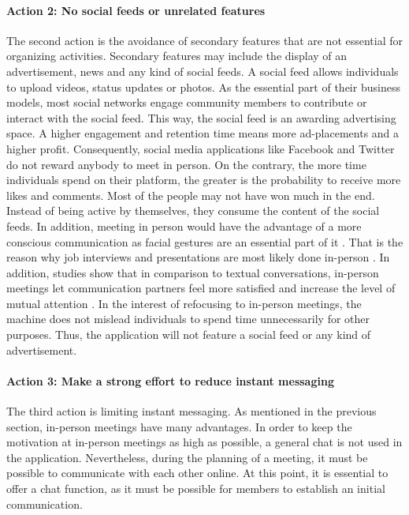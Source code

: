 \documentclass[12pt,numbers=noenddot,parskip,bibliography=totocnumbered,listof=totocnumbered]{scrreprt}
\begin{document}
\paragraph{Action 2: No social feeds or unrelated features}
The second action is the avoidance of secondary features that are not essential for organizing activities. Secondary features may include the display of an advertisement, news and any kind of social feeds. A social feed allows individuals to upload videos, status updates or photos. As the essential part of their business models, most social networks engage community members to contribute or interact with the social feed. This way, the social feed is an awarding advertising space. A higher engagement and retention time means more ad-placements and a higher profit. Consequently, social media applications like Facebook and Twitter do not reward anybody to meet in person. On the contrary, the more time individuals spend on their platform, the greater is the probability to receive more likes and comments. Most of the people may not have won much in the end. Instead of being active by themselves, they consume the content of the social feeds. In addition, meeting in person would have the advantage of a more conscious communication as facial gestures are an essential part of it  \citep{vanderkam2017}. That is the reason why job interviews and presentations are most likely done in-person \citep{vanderkam2017}. In addition, studies show that in comparison to textual conversations, in-person meetings let communication partners feel more satisfied and increase the level of mutual attention \citep{vanderkam2017}. \newline
In the interest of refocusing to in-person meetings, the machine does not mislead individuals to spend time unnecessarily for other purposes. Thus, the application will not feature a social feed or any kind of advertisement.

\paragraph{Action 3: Make a strong effort to reduce instant messaging}
The third action is limiting instant messaging. As mentioned in the previous section, in-person meetings have many advantages. In order to keep the motivation at in-person meetings as high as possible, a general chat is not used in the application. Nevertheless, during the planning of a meeting, it must be possible to communicate with each other online. At this point, it is essential to offer a chat function, as it must be possible for members to establish an initial communication.
\end{document}
